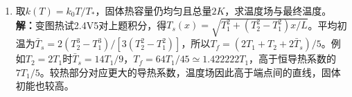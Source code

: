\documentclass[UTF8,fontset=fandol,a4paper,11pt]{ctexart}
\begin{document}
\begin{enumerate}
\item 取$k(T)=k_0T/T_*$，固体热容量仍均匀且总量$2K$，求温度场与最终温度。
\textbf{解：}变图热试2.4V5对上题积分，得$T_s(x)=\sqrt{T_1^2+(T_2^2-T_1^2)x/L}$。平均初温为$\bar T_s=2(T_2^3-T_1^3)/[3(T_2^2-T_1^2)]$，所以$T_f=(2T_1+T_2+2\bar T_s)/5$。例如$T_2=2T_1$时$\bar T_s=14T_1/9$，$T_f=64T_1/45\simeq1.422222T_1$，高于恒导热系数的$7T_1/5$。较热部分对应更大的导热系数，温度场因此高于端点间的直线，固体初能也较高。
\begin{center}\begin{minipage}{.98\linewidth}\centering
{}
\end{minipage}
\end{center}
\end{enumerate}
\end{document}
